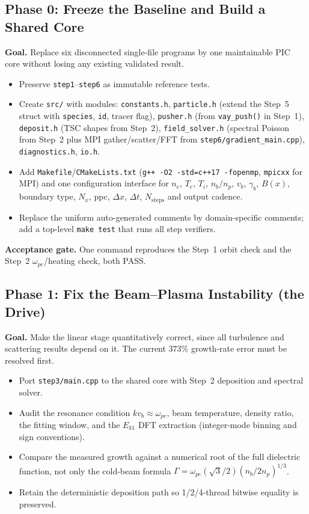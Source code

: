 \documentclass[11pt,a4paper]{article}
\begin{document}
\subsection{Phase 0: Freeze the Baseline and Build a Shared Core}

\textbf{Goal.} Replace six disconnected single-file programs by one maintainable PIC core without
losing any existing validated result.

\begin{itemize}[leftmargin=*]
  \item Preserve \texttt{step1}--\texttt{step6} as immutable reference tests.
  \item Create \texttt{src/} with modules: \texttt{constants.h}, \texttt{particle.h} (extend the
        Step~5 struct with \texttt{species}, \texttt{id}, tracer flag), \texttt{pusher.h}
        (from \texttt{vay\_push()} in Step~1), \texttt{deposit.h} (TSC shapes from Step~2),
        \texttt{field\_solver.h} (spectral Poisson from Step~2 plus MPI gather/scatter/FFT from
        \texttt{step6/gradient\_main.cpp}), \texttt{diagnostics.h}, \texttt{io.h}.
  \item Add \texttt{Makefile}/\texttt{CMakeLists.txt}
        (\texttt{g++ -O2 -std=c++17 -fopenmp}, \texttt{mpicxx} for MPI) and one configuration
        interface for $n_e$, $T_e$, $T_i$, $n_b/n_p$, $v_b$, $\gamma_b$, $B(x)$, boundary type,
        $N_x$, ppc, $\Delta x$, $\Delta t$, $N_{\mathrm{steps}}$ and output cadence.
  \item Replace the uniform auto-generated comments by domain-specific comments; add a top-level
        \texttt{make test} that runs all step verifiers.
\end{itemize}

\textbf{Acceptance gate.} One command reproduces the Step~1 orbit check and the Step~2
$\omega_{pe}$/heating check, both PASS.

\subsection{Phase 1: Fix the Beam--Plasma Instability (the Drive)}

\textbf{Goal.} Make the linear stage quantitatively correct, since all turbulence and scattering
results depend on it. The current $373\%$ growth-rate error must be resolved first.

\begin{itemize}[leftmargin=*]
  \item Port \texttt{step3/main.cpp} to the shared core with Step~2 deposition and spectral solver.
  \item Audit the resonance condition $k v_b \approx \omega_{pe}$, beam temperature, density
        ratio, the fitting window, and the $E_{k1}$ DFT extraction (integer-mode binning and
        sign conventions).
  \item Compare the measured growth against a numerical root of the full dielectric function,
        not only the cold-beam formula
        $\Gamma=\omega_{pe}(\sqrt{3}/2)(n_b/2n_p)^{1/3}$.
  \item Retain the deterministic deposition path so 1/2/4-thread bitwise equality is preserved.
\end{itemize}
\end{document}
